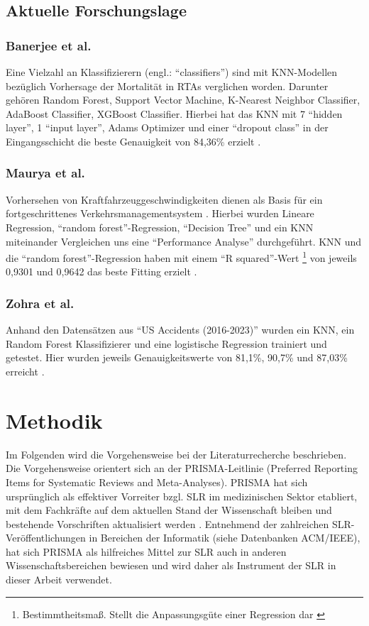 \documentclass{scrartcl}
\begin{document}
\subsection{Aktuelle Forschungslage}

\subsubsection{Banerjee et al.}
Eine Vielzahl an Klassifizierern (engl.: \enquote{classifiers}) sind mit
KNN-Modellen bezüglich Vorhersage der Mortalität in RTAs verglichen worden.
Darunter gehören
Random Forest, Support Vector Machine, K-Nearest Neighbor Classifier,
AdaBoost Classifier, XGBoost Classifier. Hierbei hat das KNN mit 7
\enquote{hidden layer}, 1 \enquote{input layer}, Adams Optimizer und einer
\enquote{dropout class} in der Eingangsschicht die beste Genauigkeit von 84,36\%
erzielt \cite{akt1}.

\subsubsection{Maurya et al.}
Vorhersehen von Kraftfahrzeuggeschwindigkeiten dienen als Basis für ein
fortgeschrittenes Verkehrsmanagementsystem \cite{akt2}. Hierbei wurden
Lineare Regression, \enquote{random forest}-Regression, \enquote{Decision Tree} und
ein KNN miteinander Vergleichen uns eine \enquote{Performance Analyse} durchgeführt.
KNN und die \enquote{random forest}-Regression haben mit einem
\enquote{R squared}-Wert \footnote{Bestimmtheitsmaß.
   Stellt die Anpassungsgüte einer Regression dar \cite{rsquared}}
von jeweils 0,9301 und 0,9642 das beste Fitting erzielt \cite{akt2}.

\subsubsection{Zohra et al.}
Anhand den Datensätzen aus \enquote{US Accidents (2016-2023)} wurden ein KNN,
ein Random Forest Klassifizierer und eine logistische Regression trainiert und
getestet. Hier wurden jeweils Genauigkeitswerte von 81,1\%, 90,7\% und 87,03\%
erreicht \cite{akt3}.


\section{Methodik}
Im Folgenden wird die Vorgehensweise bei der Literaturrecherche beschrieben.
Die Vorgehensweise orientert sich an der PRISMA-Leitlinie (Preferred Reporting
Items for Systematic Reviews and Meta-Analyses). PRISMA hat sich ursprünglich
als effektiver Vorreiter bzgl. SLR im medizinischen Sektor etabliert, mit dem
Fachkräfte auf dem aktuellen Stand der Wissenschaft bleiben und bestehende
Vorschriften aktualisiert werden \cite{prisma}. Entnehmend der zahlreichen
SLR-Veröffentlichungen in Bereichen der Informatik (siehe Datenbanken ACM/IEEE),
hat sich PRISMA als hilfreiches Mittel zur SLR auch in anderen
Wissenschaftsbereichen bewiesen und wird daher als Instrument der SLR
in dieser Arbeit verwendet.
\end{document}

